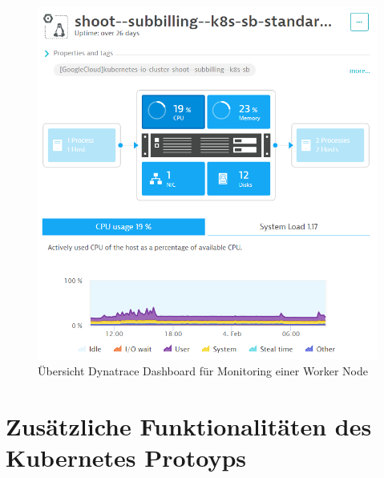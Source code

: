 \begin{figure}[h]
\begin{center}
\includegraphics[width=16cm]{img/Dynatrace_Node_Monitoring.PNG}
\caption[Übersicht Dynatrace Dashboard für Monitoring einer Worker Node]{Übersicht Dynatrace Dashboard für Monitoring einer Worker Node}
\label{anhang_grafik_dynatrace_dashboard}
\end{center}
\end{figure}

\clearpage

\section{Zusätzliche Funktionalitäten des Kubernetes Protoyps}
